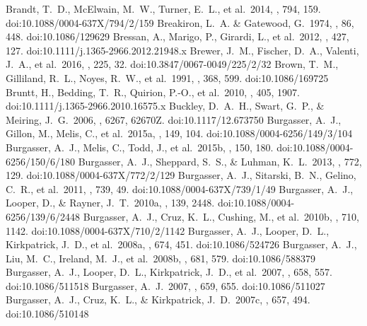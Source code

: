 \documentclass[twocolumn,tighten,twocolappendix]{aastex631}
\begin{document}
\begin{thebibliography}{}
 Brandt, T.~D., McElwain, M.~W., Turner, E.~L., et al.\ 2014, \apj, 794, 159. doi:10.1088/0004-637X/794/2/159
 Breakiron, L.~A. \& Gatewood, G.\ 1974, \pasp, 86, 448. doi:10.1086/129629
 Bressan, A., Marigo, P., Girardi, L., et al.\ 2012, \mnras, 427, 127. doi:10.1111/j.1365-2966.2012.21948.x
 Brewer, J.~M., Fischer, D.~A., Valenti, J.~A., et al.\ 2016, \apjs, 225, 32. doi:10.3847/0067-0049/225/2/32
 Brown, T.~M., Gilliland, R.~L., Noyes, R.~W., et al.\ 1991, \apj, 368, 599. doi:10.1086/169725
 Bruntt, H., Bedding, T.~R., Quirion, P.-O., et al.\ 2010, \mnras, 405, 1907. doi:10.1111/j.1365-2966.2010.16575.x
 Buckley, D.~A.~H., Swart, G.~P., \& Meiring, J.~G.\ 2006, \procspie, 6267, 62670Z. doi:10.1117/12.673750
 Burgasser, A.~J., Gillon, M., Melis, C., et al.\ 2015a, \aj, 149, 104. doi:10.1088/0004-6256/149/3/104
 Burgasser, A.~J., Melis, C., Todd, J., et al.\ 2015b, \aj, 150, 180. doi:10.1088/0004-6256/150/6/180
 Burgasser, A.~J., Sheppard, S.~S., \& Luhman, K.~L.\ 2013, \apj, 772, 129. doi:10.1088/0004-637X/772/2/129
 Burgasser, A.~J., Sitarski, B.~N., Gelino, C.~R., et al.\ 2011, \apj, 739, 49. doi:10.1088/0004-637X/739/1/49
 Burgasser, A.~J., Looper, D., \& Rayner, J.~T.\ 2010a, \aj, 139, 2448. doi:10.1088/0004-6256/139/6/2448
 Burgasser, A.~J., Cruz, K.~L., Cushing, M., et al.\ 2010b, \apj, 710, 1142. doi:10.1088/0004-637X/710/2/1142
 Burgasser, A.~J., Looper, D.~L., Kirkpatrick, J.~D., et al.\ 2008a, \apj, 674, 451. doi:10.1086/524726
 Burgasser, A.~J., Liu, M.~C., Ireland, M.~J., et al.\ 2008b, \apj, 681, 579. doi:10.1086/588379
 Burgasser, A.~J., Looper, D.~L., Kirkpatrick, J.~D., et al.\ 2007, \apj, 658, 557. doi:10.1086/511518
 Burgasser, A.~J.\ 2007, \apj, 659, 655. doi:10.1086/511027
 Burgasser, A.~J., Cruz, K.~L., \& Kirkpatrick, J.~D.\ 2007c, \apj, 657, 494. doi:10.1086/510148

\end{thebibliography}
\end{document}
